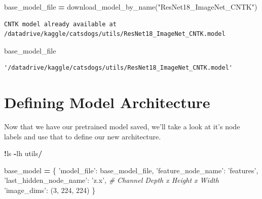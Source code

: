 \documentclass[]{book}
\newenvironment{Shaded}{\begin{snugshade}}{\end{snugshade}}
\newcommand{\DecValTok}[1]{\textcolor[rgb]{0.00,0.00,0.81}{#1}}
\newcommand{\StringTok}[1]{\textcolor[rgb]{0.31,0.60,0.02}{#1}}
\newcommand{\CommentTok}[1]{\textcolor[rgb]{0.56,0.35,0.01}{\textit{#1}}}
\newcommand{\OperatorTok}[1]{\textcolor[rgb]{0.81,0.36,0.00}{\textbf{#1}}}
\newcommand{\NormalTok}[1]{#1}
\theoremstyle{definition}
\theoremstyle{definition}
\theoremstyle{definition}
\theoremstyle{remark}
\begin{document}
\begin{Shaded}
\begin{Highlighting}[]
\NormalTok{base_model_file }\OperatorTok{=}\NormalTok{ download_model_by_name(}\StringTok{"ResNet18_ImageNet_CNTK"}\NormalTok{)}
\end{Highlighting}
\end{Shaded}

\begin{verbatim}
CNTK model already available at /datadrive/kaggle/catsdogs/utils/ResNet18_ImageNet_CNTK.model
\end{verbatim}

\begin{Shaded}
\begin{Highlighting}[]
\NormalTok{base_model_file}
\end{Highlighting}
\end{Shaded}

\begin{verbatim}
'/datadrive/kaggle/catsdogs/utils/ResNet18_ImageNet_CNTK.model'
\end{verbatim}

\section{Defining Model Architecture}\label{defining-model-architecture}

Now that we have our pretrained model saved, we'll take a look at it's
node labels and use that to define our new architecture.

\begin{Shaded}
\begin{Highlighting}[]
\OperatorTok{!}\NormalTok{ls }\OperatorTok{-}\NormalTok{lh utils}\OperatorTok{/}
\end{Highlighting}
\end{Shaded}

\begin{Shaded}
\begin{Highlighting}[]
\NormalTok{base_model }\OperatorTok{=}\NormalTok{ \{}
    \StringTok{'model_file'}\NormalTok{: base_model_file,}
    \StringTok{'feature_node_name'}\NormalTok{: }\StringTok{'features'}\NormalTok{,}
    \StringTok{'last_hidden_node_name'}\NormalTok{: }\StringTok{'z.x'}\NormalTok{,}
    \CommentTok{# Channel Depth x Height x Width}
    \StringTok{'image_dims'}\NormalTok{: (}\DecValTok{3}\NormalTok{, }\DecValTok{224}\NormalTok{, }\DecValTok{224}\NormalTok{)}
\NormalTok{\}}
\end{Highlighting}
\end{Shaded}
\end{document}
